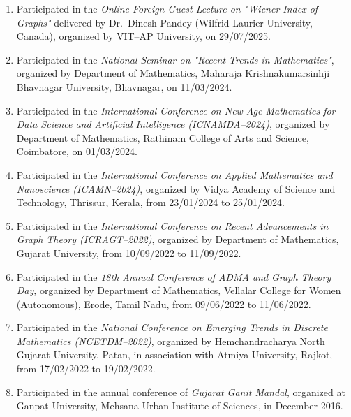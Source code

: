 \begin{enumerate}[label=\protect\circled{\arabic*}, leftmargin=*, itemsep=1ex]
\item Participated in the \emph{Online Foreign Guest Lecture on "Wiener Index of Graphs"} delivered by Dr.~Dinesh Pandey (Wilfrid Laurier University, Canada), organized by VIT--AP University, on 29/07/2025.
\item Participated in the \emph{National Seminar on "Recent Trends in Mathematics"}, organized by Department of Mathematics, Maharaja Krishnakumarsinhji Bhavnagar University, Bhavnagar, on 11/03/2024.
\item Participated in the \emph{International Conference on New Age Mathematics for Data Science and Artificial Intelligence (ICNAMDA--2024)}, organized by Department of Mathematics, Rathinam College of Arts and Science, Coimbatore, on 01/03/2024.
\item Participated in the \emph{International Conference on Applied Mathematics and Nanoscience (ICAMN--2024)}, organized by Vidya Academy of Science and Technology, Thrissur, Kerala, from 23/01/2024 to 25/01/2024.
\item Participated in the \emph{International Conference on Recent Advancements in Graph Theory (ICRAGT--2022)}, organized by Department of Mathematics, Gujarat University, from 10/09/2022 to 11/09/2022.
\item Participated in the \emph{18th Annual Conference of ADMA and Graph Theory Day}, organized by Department of Mathematics, Vellalar College for Women (Autonomous), Erode, Tamil Nadu, from 09/06/2022 to 11/06/2022.
\item Participated in the \emph{National Conference on Emerging Trends in Discrete Mathematics (NCETDM--2022)}, organized by Hemchandracharya North Gujarat University, Patan, in association with Atmiya University, Rajkot, from 17/02/2022 to 19/02/2022.
\item Participated in the annual conference of \emph{Gujarat Ganit Mandal}, organized at Ganpat University, Mehsana Urban Institute of Sciences, in December 2016.
\end{enumerate}

